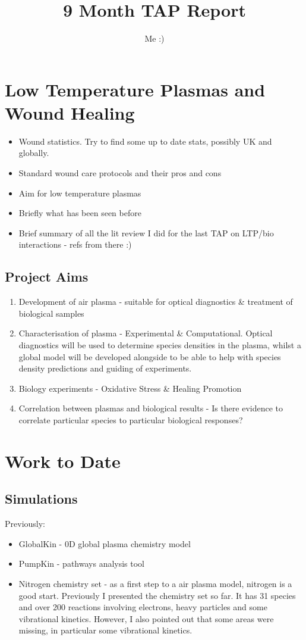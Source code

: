 \documentclass[11pt, oneside]{article}   	%
\title{9 Month TAP Report}
\author{Me :)}
\date{}							%
\begin{document}
\maketitle

\section{Low Temperature Plasmas and Wound Healing}
\begin{itemize}
\item Wound statistics. Try to find some up to date stats, possibly UK and globally.
\item Standard wound care protocols and their pros and cons
\item Aim for low temperature plasmas
\item Briefly what has been seen before
\item Brief summary of all the lit review I did for the last TAP on LTP/bio interactions - refs from there :)
\end{itemize}

\subsection{Project Aims}

\begin{enumerate}
\item Development of air plasma - suitable for optical diagnostics \& treatment of biological samples
\item Characterisation of plasma - Experimental \& Computational. Optical diagnostics will be used to determine species densities in the plasma, whilst a global model will be developed alongside to be able to help with species density predictions and guiding of experiments.
\item Biology experiments - Oxidative Stress \& Healing Promotion
\item Correlation between plasmas and biological results - Is there evidence to correlate particular species to particular biological responses?
\end{enumerate}


\section{Work to Date}
\subsection{Simulations}
Previously:
\begin{itemize}
\item GlobalKin - 0D global plasma chemistry model
\item PumpKin - pathways analysis tool
\item Nitrogen chemistry set - as a first step to a air plasma model, nitrogen is a good start. Previously I presented the chemistry set so far. It has 31 species and over 200 reactions involving electrons, heavy particles and some vibrational kinetics.
However, I also pointed out that some areas were missing, in particular some vibrational kinetics.
\end{itemize}
\end{document}
